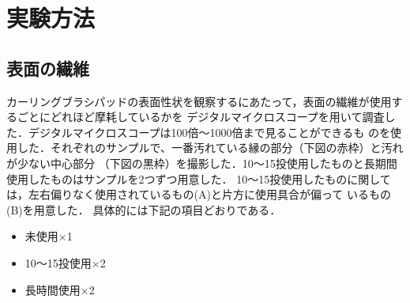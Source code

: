 \documentclass[main]{subfiles}
\begin{document}
\chapter{実験方法}
\section{表面の繊維}

カーリングブラシパッドの表面性状を観察するにあたって，表面の繊維が使用するごとにどれほど摩耗しているかを
デジタルマイクロスコープを用いて調査した．デジタルマイクロスコープは100倍～1000倍まで見ることができるも
のを使用した．それぞれのサンプルで、一番汚れている縁の部分（下図の赤枠）と汚れが少ない中心部分
（下図の黒枠）を撮影した．10～15投使用したものと長期間使用したものはサンプルを2つずつ用意した．
10～15投使用したものに関しては，左右偏りなく使用されているもの(A)と片方に使用具合が偏って
いるもの(B)を用意した．
具体的には下記の項目どおりである．

\begin{itemize}
    \item 未使用×1
    \item 10～15投使用×2
    \item 長時間使用×2
\end{itemize}
\end{document}
